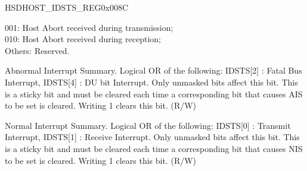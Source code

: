 \begin{register}{H}{SDHOST\_IDSTS\_REG}{0x{}008C}
\begin{regdesc}
\begin{reglist}
001: Host Abort received during transmission;\\
010: Host Abort received during reception;\\
Others: Reserved.
\item [SDHOST\_IDSTS\_AIS]Abnormal Interrupt Summary. Logical OR of the following: IDSTS[2] : Fatal Bus Interrupt, IDSTS[4] : DU bit Interrupt. Only unmasked bits affect this bit. This is a sticky bit and must be cleared each time a corresponding bit that causes AIS to be set is cleared. Writing 1 clears this bit. (R/W)
\item [SDHOST\_IDSTS\_NIS]Normal Interrupt Summary. Logical OR of the following: IDSTS[0] : Transmit Interrupt, IDSTS[1] : Receive Interrupt. Only unmasked bits affect this bit. This is a sticky bit and must be cleared each time a corresponding bit that causes NIS to be set is cleared. Writing 1 clears this bit. (R/W)
\item [Continued on the next page...]
\end{reglist}\end{regdesc}
\end{register}

